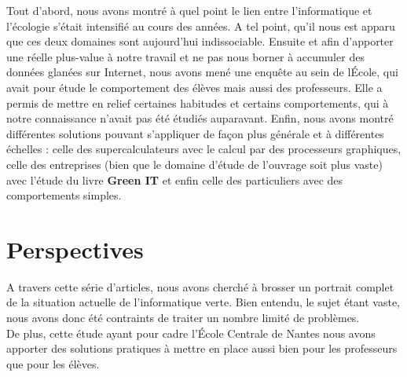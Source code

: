 \documentclass[a4paper,11pt,french]{report}
\begin{document}
Tout d'abord, nous avons montré à quel point le lien entre l'informatique et l'écologie s'était intensifié au cours des années. A tel point, qu'il nous est apparu que ces deux domaines sont aujourd'hui indissociable. 
Ensuite et afin d'apporter une réelle plus-value à notre travail et ne pas nous borner à accumuler des données glanées sur Internet, nous avons mené une enquête au sein de l\'Ecole, qui avait pour étude le comportement des élèves mais aussi des professeurs. Elle a permis de mettre en relief certaines habitudes et certains comportements, qui à notre connaissance n'avait pas été étudiés auparavant.
Enfin, nous avons montré différentes solutions pouvant s'appliquer de façon plus générale et à différentes échelles : celle des supercalculateurs avec le calcul par des processeurs graphiques, celle des entreprises (bien que le domaine d'étude de l'ouvrage soit plus vaste) avec l'étude du livre \textbf{Green IT} et enfin celle des particuliers avec des comportements simples.

\section{Perspectives}

A travers cette série d'articles, nous avons cherché à brosser un portrait complet de la situation actuelle de l'informatique verte. Bien entendu, le sujet étant vaste, nous avons donc été contraints de traiter un nombre limité de problèmes.\\
De plus, cette étude ayant pour cadre l'\'Ecole Centrale de Nantes nous avons apporter des solutions pratiques à mettre en place aussi bien pour les professeurs que pour les élèves.
\end{document}
